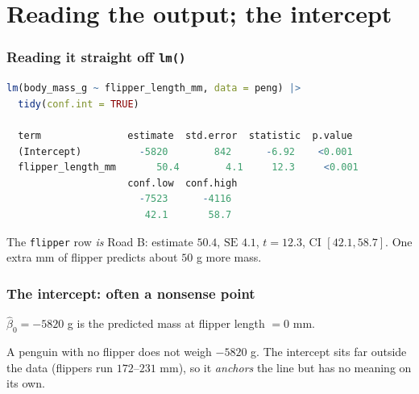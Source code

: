 \documentclass[slidestop,compress,mathserif]{beamer}
\begin{document}
\section{Reading the output; the intercept}

\begin{frame}[fragile]
\frametitle{Reading it straight off \texttt{lm()}}

\begin{lstlisting}[language=R, basicstyle=\ttfamily\scriptsize]
lm(body_mass_g ~ flipper_length_mm, data = peng) |>
  tidy(conf.int = TRUE)

  term               estimate  std.error  statistic  p.value
  (Intercept)          -5820        842      -6.92    <0.001
  flipper_length_mm       50.4        4.1     12.3     <0.001
                     conf.low  conf.high
                       -7523      -4116
                        42.1       58.7
\end{lstlisting}

\vspace{-0.2em}
{\small The \texttt{flipper} row \emph{is} Road B: estimate $50.4$, $\mathrm{SE}$ $4.1$, $t = 12.3$, CI $[42.1, 58.7]$. One extra mm of flipper predicts about $50$ g more mass.}

\end{frame}


\begin{frame}
\frametitle{The intercept: often a nonsense point}

$\hat\beta_0 = -5820$ g is the predicted mass at flipper length $= 0$ mm.

\vspace{0.3em}
{\small A penguin with no flipper does not weigh $-5820$ g. The intercept sits far outside the data (flippers run $172$--$231$ mm), so it \emph{anchors} the line but has no meaning on its own.}

\pause
\vspace{0.3em}

\end{frame}
\end{document}
